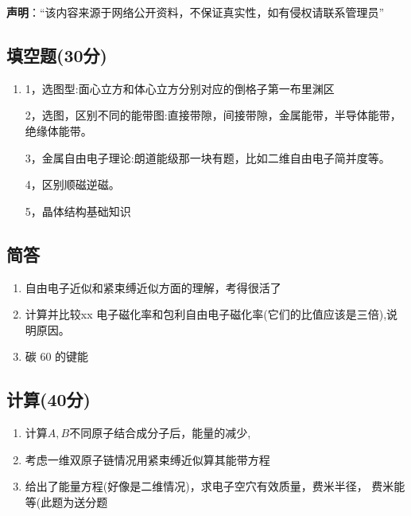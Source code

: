 
\textbf{声明}：“该内容来源于网络公开资料，不保证真实性，如有侵权请联系管理员”

\subsection{填空题(30分)}
\begin{enumerate}
\item 1，选图型:面心立方和体心立方分别对应的倒格子第一布里渊区

2，选图，区别不同的能带图:直接带隙，间接带隙，金属能带，半导体能带，绝缘体能带。

3，金属自由电子理论:朗道能级那一块有题，比如二维自由电子简并度等。

4，区别顺磁逆磁。

5，晶体结构基础知识
\end{enumerate}

\subsection{简答}
\begin{enumerate}
\item 自由电子近似和紧束缚近似方面的理解，考得很活了
\item 计算并比较xx 电子磁化率和包利自由电子磁化率(它们的比值应该是三倍),说明原因。
\item 碳 60 的键能
\end{enumerate}
\subsection{计算(40分)}
\begin{enumerate}
\item 计算$A,B$不同原子结合成分子后，能量的减少,
\item 考虑一维双原子链情况用紧束缚近似算其能带方程
\item 给出了能量方程(好像是二维情况)，求电子空穴有效质量，费米半径，
费米能等(此题为送分题
\end{enumerate}
